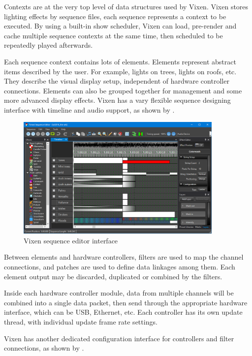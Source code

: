 Contexts are at the very top level of data structures used by Vixen. Vixen stores lighting effects by sequence files, each sequence represents a context to be executed. By using a built-in show scheduler, Vixen can load, pre-render and cache multiple sequence contexts at the same time, then scheduled to be repeatedly played afterwards.

Each sequence context contains lots of elements. Elements represent abstract items described by the user. For example, lights on trees, lights on roofs, etc. They describe the visual display setup, independent of hardware controller connections. Elements can also be grouped together for management and some more advanced display effects. Vixen has a vary flexible sequence designing interface with timeline and audio support, as shown by .

\begin{figure}[!t]
  \centering
  \includegraphics[width=0.9\textwidth]{Figs//vixen_editor.png}
  \caption{\footnotesize Vixen sequence editor interface}
  \label{fig:vixen-editor}
\end{figure}

Between elements and hardware controllers, filters are used to map the channel connections, and patches are used to define data linkages among them. Each element output may be discarded, duplicated or combined by the filters.

Inside each hardware controller module, data from multiple channels will be combined into a single data packet, then send through the appropriate hardware interface, which can be USB, Ethernet, etc. Each controller has its own update thread, with individual update frame rate settings.

Vixen has another dedicated configuration interface for controllers and filter connections, as shown by .

